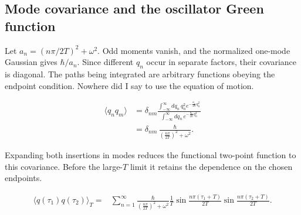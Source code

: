 \subsection{Mode covariance and the oscillator Green function}

Let $a_n=(n\pi/2T)^2+\omega^2$.  Odd moments vanish, and the normalized
one-mode Gaussian gives $\hbar/a_n$.  Since different $q_n$ occur in separate
factors, their covariance is diagonal.  The paths being integrated are
arbitrary functions obeying the endpoint condition.  Nowhere did I say to use
the equation of motion.

\begin{align}
  \langle q_nq_m\rangle
  &=\delta_{nm}
  \frac{
    \displaystyle\int_{-\infty}^{\infty}dq_n\,q_n^2
    e^{-\frac{a_n}{2\hbar}q_n^2}}
  {
    \displaystyle\int_{-\infty}^{\infty}dq_n\,
    e^{-\frac{a_n}{2\hbar}q_n^2}}
  \nonumber\\
  &=\delta_{nm}\,
  \frac{\hbar}{\left(\frac{n\pi}{2T}\right)^2+\omega^2}.
  \label{eq:proposal-mode-covariance}
\end{align}

Expanding both insertions in modes reduces the functional two-point function
to this covariance.  Before the large-$T$ limit it retains the dependence on
the chosen endpoints.

\begin{align}
  \langle q(\tau_1)q(\tau_2)\rangle_T
  ={}&\sum_{n=1}^{\infty}
  \frac{\hbar}{\left(\frac{n\pi}{2T}\right)^2+\omega^2}
  \frac1T
  \sin\frac{n\pi(\tau_1+T)}{2T}
  \sin\frac{n\pi(\tau_2+T)}{2T}.
  \label{eq:proposal-finite-T-covariance}
\end{align}

